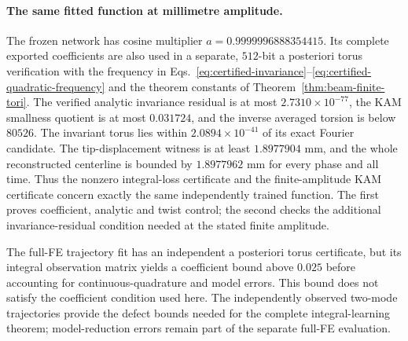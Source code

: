 \paragraph{The same fitted function at millimetre amplitude.}
The frozen network has cosine multiplier
$a=0.9999996888354415$.
Its complete exported coefficients are also used in a separate,
$512$-bit a posteriori torus verification with the frequency in
Eqs.~\eqref{eq:certified-invariance}--\eqref{eq:certified-quadratic-frequency}
and the theorem constants of Theorem~\ref{thm:beam-finite-tori}.
The verified analytic invariance residual is at most
$2.7310\times10^{-77}$, the KAM smallness quotient is at most
$0.031724$, and the inverse averaged torsion is below $80526$.
The invariant torus lies within $2.0894\times10^{-41}$ of its exact
Fourier candidate. The tip-displacement witness is at least
$1.8977904$ mm, and the whole reconstructed centerline is bounded by
$1.8977962$ mm for every phase and all time.
Thus the nonzero integral-loss certificate and the finite-amplitude
KAM certificate concern exactly the same independently trained function.
The first proves coefficient, analytic and twist control; the second
checks the additional invariance-residual condition needed at the stated
finite amplitude.

The full-FE trajectory fit has an independent a posteriori torus
certificate, but its integral observation matrix yields a coefficient
bound above $0.025$ before accounting for continuous-quadrature and
model errors. This bound does not satisfy the coefficient condition
used here. The independently observed two-mode trajectories provide
the defect bounds needed for the complete integral-learning theorem;
model-reduction errors remain part of the separate full-FE evaluation.
